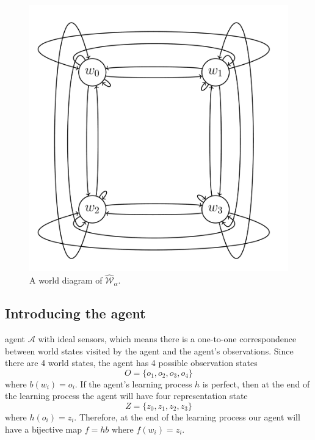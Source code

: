 \begin{figure}[H]
    \centering
    \includegraphics[width=\linewidth]{2MathematicalFramework/Images/2x2_cyclical_minimum_transformations.png}
    \caption{
    A world diagram of $\hat{\mathscr{W}}_{\alpha}$.
    }
    \label{fig:2x2_cyclical_minimum_transformations}
\end{figure}

\subsection{Introducing the agent}

 agent $\mathscr{A}$ with ideal sensors, which means there is a one-to-one correspondence between world states visited by the agent and the agent's observations.
Since there are 4 world states, the agent has 4 possible observation states
\begin{equation}
    O = \{ o_{1}, o_{2}, o_{3}, o_{4} \}
\end{equation}
where $b(w_{i}) = o_{i}$.
If the agent's learning process $h$ is perfect, then at the end of the learning process the agent will have four representation state
\begin{equation}
    Z = \{ z_{0}, z_{1}, z_{2}, z_{3} \}
\end{equation}
where $h(o_{i}) = z_{i}$.
Therefore, at the end of the learning process our agent will have a bijective map $f = hb$ where $f(w_{i}) = z_{i}$.

